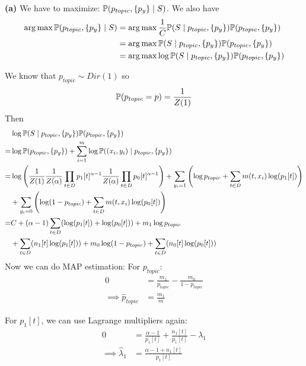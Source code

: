 \documentclass[a4paper, 11pt]{article}
\begin{document}
\begin{problem}
    \textbf{(a)} We have to maximize: $\mathbb{P}(p_{topic}, \{p_y\} \mid S) $. We also have
    \begin{align*}
        \operatorname*{arg\,max} \mathbb{P}(p_{topic}, \{p_y\} \mid S) &= \operatorname*{arg\,max} \frac{1}{C} \mathbb{P}(S \mid p_{topic}, \{p_y\}) \mathbb{P}(p_{topic}, \{p_y\}) \\
        &= \operatorname*{arg\,max} \mathbb{P}(S \mid p_{topic}, \{p_y\}) \mathbb{P}(p_{topic}, \{p_y\}) \\
        &= \operatorname*{arg\,max} \log \mathbb{P}(S \mid p_{topic}, \{p_y\}) \mathbb{P}(p_{topic}, \{p_y\}) 
    \end{align*}

    We know that $p_{topic} \sim Dir(1)$ so \begin{equation*}
        \mathbb{P}(p_{topic} = p) = \frac{1}{Z(1)}
    \end{equation*}
    Then \begin{align*}
        &\log \mathbb{P}(S \mid p_{topic}, \{p_y\}) \mathbb{P}(p_{topic}, \{p_y\})\\
        = &\log \mathbb{P}(p_{topic}, \{p_y\})  + \sum_{i=1}^{m}\log \mathbb{P}((x_i, y_i) \mid p_{topic}, \{p_y\}) \\
        = &\log \left(\frac{1}{Z(1)} \frac{1}{Z(\alpha)} \prod_{t \in D} p_1[t]^{\alpha - 1} \frac{1}{Z(\alpha)} \prod_{t \in D} p_0[t]^{\alpha-1}\right) + \sum_{y_i = 1} \left(\log p_{topic} + \sum_{t \in D} m(t, x_i) \log(p_1[t])\right) \\
        &+ \sum_{y_i = 0} \left(\log (1 -p_{topic}) + \sum_{t \in D} m(t, x_i) \log(p_0[t])\right) \\
        = & C + (\alpha-1)\sum_{t \in D }(\log(p_1[t]) + \log(p_0[t])) + m_1 \log p_{topic} \\
        &+ \sum_{t \in D } (n_1[t] \log(p_1[t])) + m_0 \log(1 - p_{topic}) +  \sum_{t \in D} (n_0[t] \log(p_0[t])) \\
    \end{align*}
    Now we can do MAP estimation:
    For $p_{topic}$: \begin{align*}
        0 &= \frac{m_1}{p_{topic}} - \frac{m_0}{1 - p_{topic}}  \\
    \implies \hat{p}_{topic} &= \frac{m_1}{m}
    \end{align*}

    For $p_1[t]$, we can use Lagrange multipliers again:
    \begin{align*}
        0 &= \frac{\alpha - 1}{p_1[t]} + \frac{n_1[t]}{p_1[t]} - \lambda_1 \\
        \implies \hat{\lambda}_1 &= \frac{\alpha - 1 + n_1[t]}{p_1[t]}
    \end{align*}


\end{problem}
\end{document}
